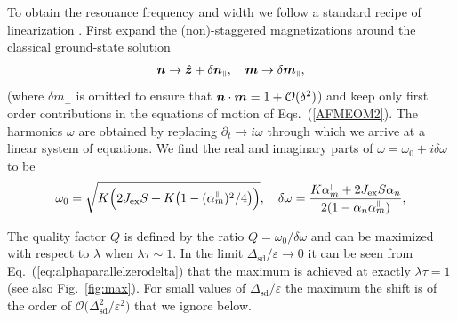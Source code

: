 \eml
To obtain the resonance frequency and width we follow a standard recipe of linearization \cite{keffer_theory_1952}. First expand the (non)-staggered magnetizations around the classical ground-state solution
\begin{align}
    \boldsymbol{n}\rightarrow\hat{\boldsymbol{z}} + \delta\boldsymbol{n}_{\scriptscriptstyle\parallel},\quad \boldsymbol{m}\rightarrow \delta\boldsymbol{m}_{\scriptscriptstyle\parallel},
\end{align} 
(where $\delta m_\perp$ is omitted to ensure that $\boldsymbol{n}\cdot\boldsymbol{m}=1+\mathcal{O}(\delta^2)$) and keep only first order contributions in the equations of motion of Eqs.~(\ref{AFMEOM2}). The harmonics $\omega$ are obtained by replacing $\partial_t \rightarrow i\omega$ through which we arrive at a linear system of equations. We find the real and imaginary parts of $\omega = \omega_0 + i \delta\omega$ to be
\begin{align}
    \omega_0 = \sqrt{K\Big(2J_\text{ex}S + K\big(1- (\alpha_m^{{\scriptscriptstyle\parallel}})^2 / 4\big)\Big)},\quad \delta\omega =  \frac{K \alpha_m^{{\scriptscriptstyle\parallel}} + 2J_\text{ex}S \alpha_n }{2(1- \alpha_n \alpha_m^{{\scriptscriptstyle\parallel}})},
\end{align}

The quality factor $Q$ is defined by the ratio $Q=\omega_0/\delta\omega$ and can be maximized with respect to $\lambda$ when $\lambda\tau\sim1$. In the limit $\Delta_\text{sd}/\varepsilon\rightarrow0$ it can be seen from Eq.~(\ref{eq:alphaparallelzerodelta}) that the maximum is achieved at exactly $\lambda\tau=1$ (see also Fig.~\ref{fig:max}). For small values of $\Delta_\text{sd}/\varepsilon$ the maximum the shift is of the order of $\mathcal{O}\big(\Delta_\text{sd}^2/\varepsilon^2\big)$ that we ignore below.


